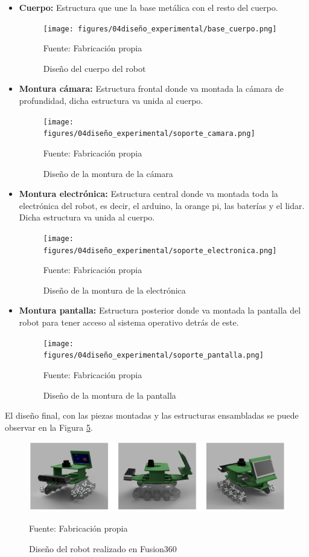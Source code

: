 \begin{itemize}
    \item \textbf{Cuerpo: }Estructura que une la base metálica con el resto del cuerpo.
    \begin{figure}[H]
        \centering
        \texttt{[image: figures/04diseño\_experimental/base\_cuerpo.png]}
        \caption{ Diseño del cuerpo del robot } 
        Fuente: Fabricación propia
        \label{fig:robocop_cuerpo}
    \end{figure}
    \item \textbf{Montura cámara: }Estructura frontal donde va montada la cámara de profundidad, dicha estructura va unida al cuerpo.
    \begin{figure}[H]
        \centering
        \texttt{[image: figures/04diseño\_experimental/soporte\_camara.png]}
        \caption{ Diseño de la montura de la cámara} 
        Fuente: Fabricación propia
        \label{fig:robocop_camara}
    \end{figure}
    \item \textbf{Montura electrónica: }Estructura central donde va montada toda la electrónica del robot, es decir, el arduino, la orange pi, las baterías y el lidar. Dicha estructura va unida al cuerpo.
    \begin{figure}[H]
        \centering
        \texttt{[image: figures/04diseño\_experimental/soporte\_electronica.png]}
        \caption{ Diseño de la montura de la electrónica} 
        Fuente: Fabricación propia
        \label{fig:robocop_electronica}
    \end{figure}
    \item \textbf{Montura pantalla: }Estructura posterior donde va montada la pantalla del robot para tener acceso al sistema operativo detrás de este.
    \begin{figure}[H]
        \centering
        \texttt{[image: figures/04diseño\_experimental/soporte\_pantalla.png]}
        \caption{ Diseño de la montura de la pantalla} 
        Fuente: Fabricación propia
        \label{fig:robocop_pantalla}
    \end{figure}
\end{itemize}

El diseño final, con las piezas montadas y las estructuras ensambladas se puede observar en la Figura  \ref{fig:robocop_diseño}.
\begin{figure}[H]
\centering
\includegraphics[width=15cm]{figures/04diseño_experimental/robocop_diseño.png}
\caption{ Diseño del robot realizado en Fusion360 } 
Fuente: Fabricación propia
\label{fig:robocop_diseño}
\end{figure}

